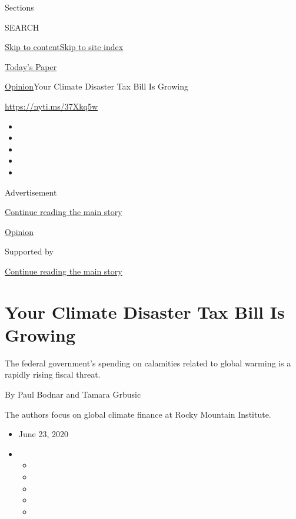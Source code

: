 Sections

SEARCH

\protect\hyperlink{site-content}{Skip to
content}\protect\hyperlink{site-index}{Skip to site index}

\href{https://myaccount.nytimes3xbfgragh.onion/auth/login?response_type=cookie\&client_id=vi}{}

\href{https://www.nytimes3xbfgragh.onion/section/todayspaper}{Today's
Paper}

\href{/section/opinion}{Opinion}\textbar{}Your Climate Disaster Tax Bill
Is Growing

\url{https://nyti.ms/37Xkq5w}

\begin{itemize}
\item
\item
\item
\item
\item
\end{itemize}

Advertisement

\protect\hyperlink{after-top}{Continue reading the main story}

\href{/section/opinion}{Opinion}

Supported by

\protect\hyperlink{after-sponsor}{Continue reading the main story}

\hypertarget{your-climate-disaster-tax-bill-is-growing}{%
\section{Your Climate Disaster Tax Bill Is
Growing}\label{your-climate-disaster-tax-bill-is-growing}}

The federal government's spending on calamities related to global
warming is a rapidly rising fiscal threat.

By Paul Bodnar and Tamara Grbusic

The authors focus on global climate finance at Rocky Mountain Institute.

\begin{itemize}
\item
  June 23, 2020
\item
  \begin{itemize}
  \item
  \item
  \item
  \item
  \item
  \end{itemize}
\end{itemize}

